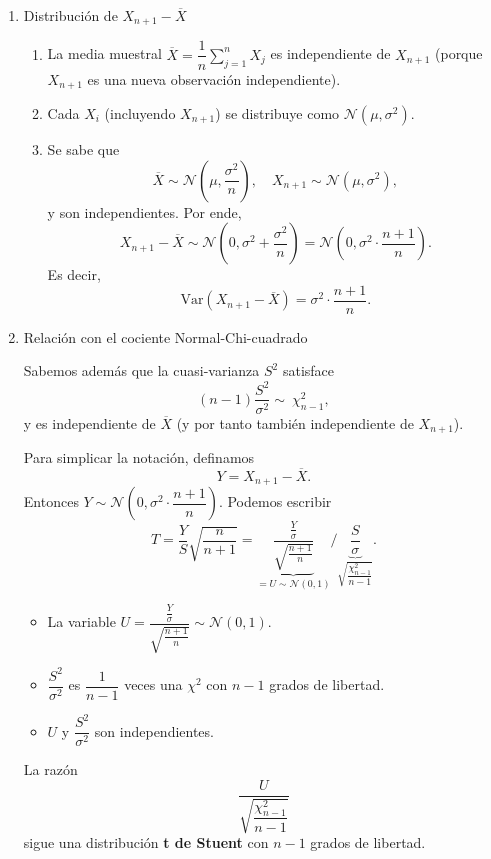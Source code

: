 \begin{enumerate}[label=\color{red}\textbf{\arabic*)}]
\begin{enumerate}[label=\arabic*)]
    \item Distribución de $X_{n+1}-\overline{X}$ 
        \begin{enumerate}[label=\arabic*)]
            \item La media muestral $\overline{X}=\dfrac{1}{n}\sum_{j=1}^{n} X_j$ es independiente de $X_{n+1}$ (porque $X_{n+1}$ es una nueva observación independiente).
            \item Cada $X_i$ (incluyendo $X_{n+1}$) se distribuye como $\mathcal{N}(\mu,\sigma^2)$.
            \item Se sabe que \[
            \overline{X}\sim \mathcal{N}\left( \mu,\dfrac{\sigma^2}{n} \right) ,\quad X_{n+1}\sim \mathcal{N}(\mu,\sigma^2),
            \] 
            y son independientes. Por ende, \[
            X_{n+1}-\overline{X}\sim \mathcal{N}\left( 0,\sigma^2+\dfrac{\sigma^2}{n} \right) =\mathcal{N}\left( 0,\sigma^2\cdot \dfrac{n+1}{n} \right) .
            \] 
            Es decir, \[
            \mathrm{Var}(X_{n+1}-\overline{X})=\sigma^2\cdot \dfrac{n+1}{n}.
            \] 
        \end{enumerate}
    \item Relación con el cociente Normal-Chi-cuadrado

        Sabemos además que la cuasi-varianza $S^2$ satisface \[
            (n-1) \dfrac{S^2}{\sigma^2}\sim ~\chi_{n-1}^2,
        \] y es independiente de $\overline{X}$ (y por tanto también independiente de $X_{n+1}$).

        Para simplicar la notación, definamos \[
        Y=X_{n+1}-\overline{X}.
        \] 
        Entonces $Y\sim \mathcal{N}\left( 0,\sigma^2\cdot \dfrac{n+1}{n} \right) $. Podemos escribir \[
            T=\dfrac{Y}{S}\sqrt{\dfrac{n}{n+1}} =\underbrace{\dfrac{\frac{Y}{\sigma} }{\sqrt{\frac{n+1}{n} } }}_{\displaystyle =U\sim \mathcal{N}(0,1)} \bigg/ \underbrace{\dfrac{S}{\sigma}}_{\displaystyle \sqrt{\dfrac{\chi_{n-1}^2}{n-1}} }.
        \] 
        \begin{itemize}[label=\textbullet]
            \item La variable $U=\dfrac{\frac{Y}{\sigma} }{\sqrt{\frac{n+1}{n} } }\sim \mathcal{N}(0,1)$.
            \item $\dfrac{S^2}{\sigma^2}$ es $\dfrac{1}{n-1}$ veces una $\chi^2$ con $n-1$ grados de libertad.
            \item  $U$ y $\dfrac{S^2}{\sigma^2}$ son independientes.
        \end{itemize}
        La razón \[
        \dfrac{U}{\sqrt{\dfrac{\chi_{n-1}^2}{n-1}} }
        \] sigue una distribución \textbf{t de Stuent} con $n-1$ grados de libertad.


\end{enumerate}
\end{enumerate}
